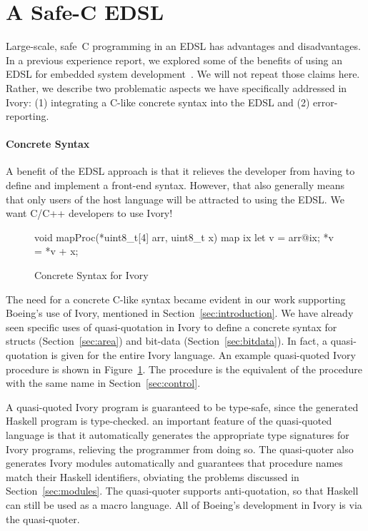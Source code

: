 \section{A Safe-C EDSL}
\label{sec:edsl}

Large-scale, safe~C programming in an EDSL has advantages and disadvantages. In
a previous experience report, we explored some of the benefits of using an EDSL
for embedded system development~\cite{smaccm}. We will not repeat those claims
here. Rather, we describe two problematic aspects we have specifically addressed in Ivory:
(1) integrating a C-like concrete syntax into the EDSL and (2) error-reporting.

\paragraph{Concrete Syntax}

A benefit of the EDSL approach is that it relieves the developer from having to
define and implement a front-end syntax. However, that also generally means that
only users of the host language will be attracted to using the
EDSL. We want C/C++ developers to use Ivory!

\begin{figure}[h!]
\begin{code}
void mapProc(*uint8_t[4] arr, uint8_t x) {
  map ix {
    let v = arr@ix;
    *v = *v + x;
  }
}
\end{code}
  \caption{Concrete Syntax for Ivory}
  \label{fig:concrete}
\end{figure}


The need for a concrete C-like syntax became evident in our work supporting
Boeing's use of Ivory, mentioned in Section~\ref{sec:introduction}. We have
already seen specific uses of quasi-quotation in Ivory to define a concrete
syntax for structs (Section~\ref{sec:area}) and bit-data
(Section~\ref{sec:bitdata}). In fact, a quasi-quotation is given for the entire
Ivory language. An example quasi-quoted Ivory procedure is shown in
Figure~\ref{fig:concrete}. The procedure is the equivalent of the procedure with
the same name in Section~\ref{sec:control}.

A quasi-quoted Ivory program is guaranteed to be type-safe, since the generated
Haskell program is type-checked. an important feature of the quasi-quoted
language is that it automatically generates the appropriate type signatures for
Ivory programs, relieving the programmer from doing so. The quasi-quoter also
generates Ivory modules automatically and guarantees that procedure names match
their Haskell identifiers, obviating the problems discussed in
Section~\ref{sec:modules}. The quasi-quoter supports anti-quotation, so that
Haskell can still be used as a macro language. All of Boeing's development in
Ivory is via the quasi-quoter.

